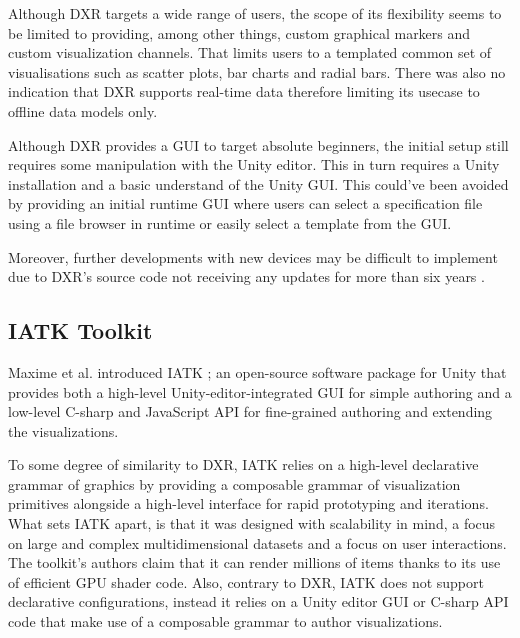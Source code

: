 \documentclass{vgtc}                          %
\begin{document}
\medskip

\noindent Although DXR targets a wide range of users, the scope of its flexibility seems to be limited to
providing, among other things, custom graphical markers and custom visualization channels. That limits users
to a templated common set of visualisations such as scatter plots, bar charts and radial bars. There was also
no indication that DXR supports real-time data therefore limiting its usecase to offline data models only.

\noindent Although DXR provides a GUI to target absolute beginners, the initial setup still requires some
manipulation with the Unity editor. This in turn requires a Unity installation and a basic understand of the
Unity GUI. This could've been avoided by providing an initial runtime GUI where users can select a
specification file using a file browser in runtime or easily select a template from the GUI.

\noindent Moreover, further developments with new devices may be difficult to implement due to DXR's source
code not receiving any updates for more than six years \cite{dxr:repo}.

\subsection{IATK Toolkit}
Maxime et al. introduced IATK \cite{iatk_toolkit}; an open-source \cite{iatk:repo} software package for Unity
that provides both a high-level Unity-editor-integrated GUI for simple authoring and a low-level C-sharp
and JavaScript API for fine-grained authoring and extending the visualizations.

\smallskip

\noindent To some degree of similarity to DXR, IATK relies on a high-level
declarative grammar of graphics by providing a composable grammar of
visualization primitives alongside a high-level interface for rapid prototyping
and iterations. What sets IATK apart, is that it was designed with scalability
in mind, a focus on large and complex multidimensional datasets and a focus on
user interactions. The toolkit's authors claim that it can render millions of
items thanks to its use of efficient GPU shader code. Also, contrary to DXR,
IATK does not support declarative configurations, instead it relies on a Unity
editor GUI or C-sharp API code that make use of a composable grammar to author
visualizations.

\smallskip
\end{document}
